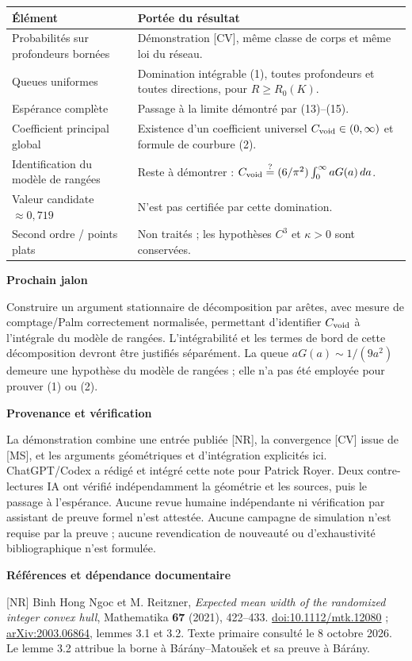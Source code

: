 \documentclass[11pt,a4paper]{article}
\newcommand{\head}[1]{\vspace{3pt}{\large\bfseries\color{navy}#1}\par}
\newcommand{\subhead}[1]{{\bfseries\color{navy}#1}\par}
\begin{document}
\newpage
\head{6. Statuts, dépendances et prochain pont}
\begin{tabularx}{\textwidth}{@{}p{}X@{}}
\toprule
Élément & Portée du résultat\\
\midrule
Probabilités sur profondeurs bornées & Démonstration [CV], même classe de corps et même loi du réseau.\\
Queues uniformes & Domination intégrable (1), toutes profondeurs et toutes directions, pour $R\ge R_0(K)$.\\
Espérance complète & Passage à la limite démontré par (13)--(15).\\
Coefficient principal global & Existence d'un coefficient universel $C_{\rm void}\in(0,\infty)$ et formule de courbure (2).\\
Identification du modèle de rangées & Reste à démontrer : $C_{\rm void}\stackrel{?}{=}(6/\pi^2)\int_0^\infty aG(a)\,da$.\\
Valeur candidate $\approx0,719$ & N'est pas certifiée par cette domination.\\
Second ordre / points plats & Non traités ; les hypothèses $C^3$ et $\kappa>0$ sont conservées.\\
\bottomrule
\end{tabularx}

\subhead{Prochain jalon}
Construire un argument stationnaire de décomposition par arêtes, avec mesure de comptage/Palm correctement normalisée, permettant d'identifier $C_{\rm void}$ à l'intégrale du modèle de rangées. L'intégrabilité et les termes de bord de cette décomposition devront être justifiés séparément. La queue $aG(a)\sim1/(9a^2)$ demeure une hypothèse du modèle de rangées ; elle n'a pas été employée pour prouver (1) ou (2).

\subhead{Provenance et vérification}
La démonstration combine une entrée publiée [NR], la convergence [CV] issue de [MS], et les arguments géométriques et d'intégration explicités ici. ChatGPT/Codex a rédigé et intégré cette note pour Patrick Royer. Deux contre-lectures IA ont vérifié indépendamment la géométrie et les sources, puis le passage à l'espérance. Aucune revue humaine indépendante ni vérification par assistant de preuve formel n'est attestée. Aucune campagne de simulation n'est requise par la preuve ; aucune revendication de nouveauté ou d'exhaustivité bibliographique n'est formulée.

\subhead{Références et dépendance documentaire}
\small\raggedright
[NR] Binh Hong Ngoc et M. Reitzner, \textit{Expected mean width of the randomized integer convex hull}, Mathematika \textbf{67} (2021), 422--433. \href{https://doi.org/10.1112/mtk.12080}{doi:10.1112/mtk.12080} ; \href{https://arxiv.org/abs/2003.06864}{arXiv:2003.06864}, lemmes 3.1 et 3.2. Texte primaire consulté le 8 octobre 2026. Le lemme 3.2 attribue la borne à Bárány--Matoušek et sa preuve à Bárány.
\end{document}
